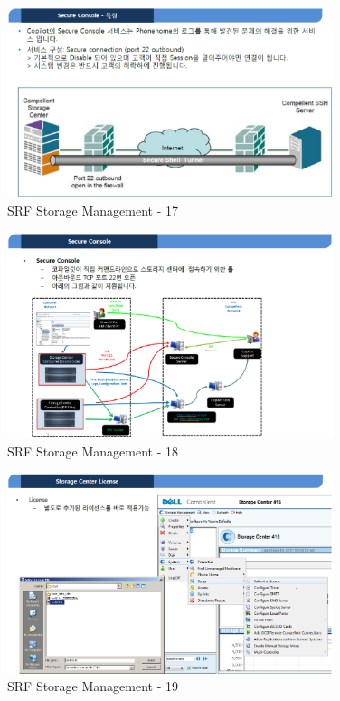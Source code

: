 \documentclass[11pt
  , a4paper
  , article
  , oneside
]{memoir}
\begin{document}
\begin{figure}[h!]
	\centering
	\includegraphics[width=0.85\textwidth]{./images/srfdb_storage_mana_17.eps}
	\caption{SRF Storage Management - 17}
	\label{fig:srfdb_mana_17} 
\end{figure}

\begin{figure}[h!]
	\centering
	\includegraphics[width=0.85\textwidth]{./images/srfdb_storage_mana_18.eps}
	\caption{SRF Storage Management - 18}
	\label{fig:srfdb_mana_18} 
\end{figure}

\clearpage

\begin{figure}[h!]
	\centering
	\includegraphics[width=0.85\textwidth]{./images/srfdb_storage_mana_19.eps}
	\caption{SRF Storage Management - 19}
	\label{fig:srfdb_mana_19} 
\end{figure}
\end{document}
